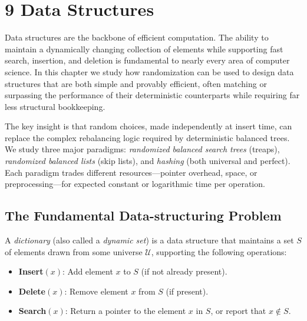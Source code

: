 \documentclass[twoside,12pt]{book}
\theoremstyle{plain}
\theoremstyle{definition}
\theoremstyle{remark}
\begin{document}
\chapter*{9 Data Structures}
\label{ch:data-structures}

Data structures are the backbone of efficient computation. The ability to maintain a dynamically changing collection of elements while supporting fast search, insertion, and deletion is fundamental to nearly every area of computer science. In this chapter we study how randomization can be used to design data structures that are both simple and provably efficient, often matching or surpassing the performance of their deterministic counterparts while requiring far less structural bookkeeping.

The key insight is that random choices, made independently at insert time, can replace the complex rebalancing logic required by deterministic balanced trees. We study three major paradigms: \emph{randomized balanced search trees} (treaps), \emph{randomized balanced lists} (skip lists), and \emph{hashing} (both universal and perfect). Each paradigm trades different resources---pointer overhead, space, or preprocessing---for expected constant or logarithmic time per operation.

\section{The Fundamental Data-structuring Problem}
\label{sec:fundamental-data-structuring}

A \emph{dictionary} (also called a \emph{dynamic set}) is a data structure that maintains a set $S$ of elements drawn from some universe $\mathcal{U}$, supporting the following operations:

\begin{itemize}[nosep]
    \item \textbf{Insert}$(x)$: Add element $x$ to $S$ (if not already present).
    \item \textbf{Delete}$(x)$: Remove element $x$ from $S$ (if present).
    \item \textbf{Search}$(x)$: Return a pointer to the element $x$ in $S$, or report that $x \notin S$.
\end{itemize}
\end{document}
